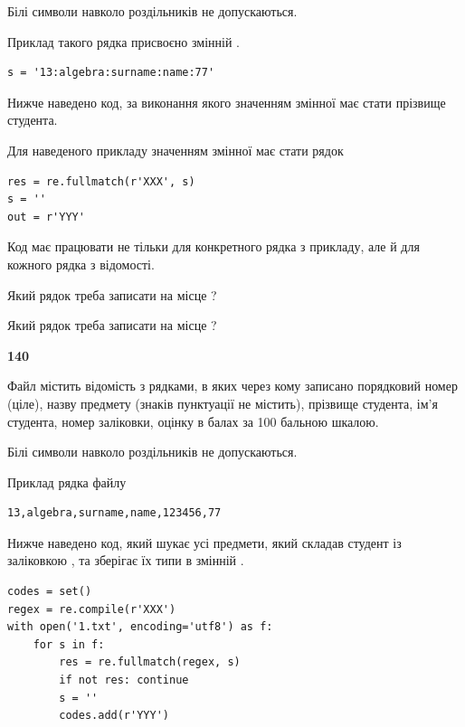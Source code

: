 Білі символи навколо роздільників не допускаються.

Приклад такого рядка присвоєно змінній .



\begin{verbatim}
s = '13:algebra:surname:name:77'
\end{verbatim}


Нижче наведено код, за виконання якого значенням змінної  має стати прізвище студента.

Для наведеного прикладу значенням змінної  має стати рядок 



\begin{verbatim}
res = re.fullmatch(r'XXX', s)
s = ''
out = r'YYY'
\end{verbatim}


Код має працювати не тільки для конкретного рядка з прикладу, але й для кожного рядка з відомості.




Який рядок треба записати на місце  ?\par
\vspace{5mm}


Який рядок треба записати на місце  ?\par


\newpage

{\begin {center}\textbf{ 140}\end {center}}\par
Файл  містить відомість з рядками, в яких через кому записано поряд\-ковий номер (ціле), назву предмету (знаків пунктуації не містить), прізвище студента, ім'я студента, номер заліковки, оцінку в балах за 100 бальною шкалою.

Білі символи навколо роздільників не допускаються.

Приклад рядка файлу



\begin{verbatim}
13,algebra,surname,name,123456,77
\end{verbatim}


Нижче наведено код, який шукає усі предмети, який складав студент із заліковкою , та зберігає їх типи в змінній .



\begin{verbatim}
codes = set()
regex = re.compile(r'XXX')
with open('1.txt', encoding='utf8') as f:
    for s in f:
        res = re.fullmatch(regex, s)
        if not res: continue
        s = ''
        codes.add(r'YYY')
\end{verbatim}





